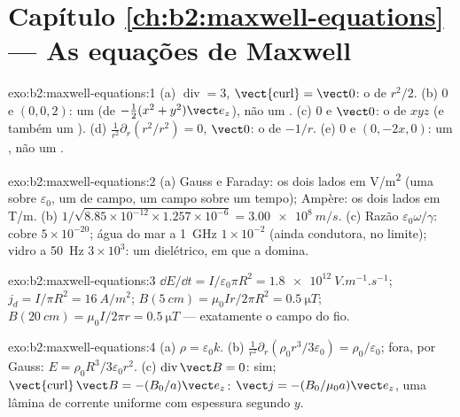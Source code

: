 \section*{Capítulo \ref{ch:b2:maxwell-equations} --- As equações de Maxwell}

\begin{solution}{exo:b2:maxwell-equations:1}
(a) $\operatorname{div} = 3$, $\operatorname{\vect{curl}} = \vect 0$: o  de $r^2/2$.
(b) $0$ e $(0, 0, 2)$: um  (de $-\tfrac12(x^2 + y^2)\vect e_z$), não um
. (c) $0$ e $\vect 0$: o  de $xyz$ (e também um ). (d)
$\frac1{r^2}\partial_r(r^2/r^2) = 0$,  $\vect 0$: o  de $-1/r$. (e)
$0$ e $(0, -2x, 0)$: um , não um .
\end{solution}

\begin{solution}{exo:b2:maxwell-equations:2}
(a) Gauss e Faraday: os dois lados em \unit{V/m^2} (uma  sobre
$\varepsilon_0$, um  de campo, um campo sobre um tempo); Ampère: os dois lados em
\unit{T/m}.
(b) $1/\sqrt{8.85 \times 10^{-12} \times 1.257 \times 10^{-6}} = \qty{3.00e8}{m/s}$. (c) Razão
$\varepsilon_0\omega/\gamma$: cobre $5 \times 10^{-20}$; água do mar a \qty{1}{GHz} $1 \times 10^{-2}$
(ainda condutora, no limite); vidro a \qty{50}{Hz} $3 \times 10^3$: um dielétrico,
em que a  domina.
\end{solution}

\begin{solution}{exo:b2:maxwell-equations:3}
$\dd E/\dd t = I/\varepsilon_0\pi R^2 = \qty{1.8e12}{V.m^{-1}.s^{-1}}$; $j_d = I/\pi R^2 =
\qty{16}{A/m^2}$; $B(\qty{5}{cm}) = \mu_0Ir/2\pi R^2 = \qty{0.5}{\micro T}$; $B(\qty{20}{cm}) =
\mu_0I/2\pi r = \qty{0.5}{\micro T}$ --- exatamente o campo do fio.
\end{solution}

\begin{solution}{exo:b2:maxwell-equations:4}
(a) $\rho = \varepsilon_0k$. (b) $\frac1{r^2}\partial_r(\rho_0r^3/3\varepsilon_0) = \rho_0/\varepsilon_0$;
fora, por Gauss: $E = \rho_0R^3/3\varepsilon_0r^2$. (c) $\operatorname{div}\vect B = 0$: sim;
$\operatorname{\vect{curl}}\vect B = -(B_0/a)\vect e_z$: $\vect j = -(B_0/\mu_0a)\vect e_z$, uma
lâmina de corrente uniforme com espessura segundo $y$.
\end{solution}

